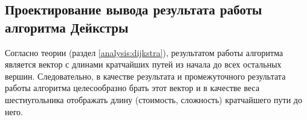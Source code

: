 \subsection{Проектирование вывода результата работы алгоритма Дейкстры}
Согласно теории (раздел \ref{analysis:dijkstra}), результатом работы алгоритма является вектор с длинами кратчайших путей из начала до всех остальных вершин. Следовательно, в качестве результата и промежуточного результата работы алгоритма целесообразно брать этот вектор и в качестве веса шестиугольника отображать длину (стоимость, сложность) кратчайшего пути до него.